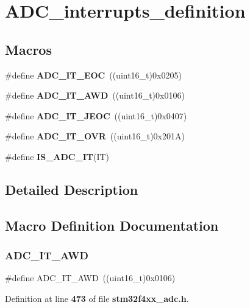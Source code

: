 \section{A\+D\+C\+\_\+interrupts\+\_\+definition}
\label{group__ADC__interrupts__definition}
\subsection*{Macros}
\begin{DoxyCompactItemize}
\item 
\#define \textbf{ A\+D\+C\+\_\+\+I\+T\+\_\+\+E\+OC}~((uint16\+\_\+t)0x0205)
\item 
\#define \textbf{ A\+D\+C\+\_\+\+I\+T\+\_\+\+A\+WD}~((uint16\+\_\+t)0x0106)
\item 
\#define \textbf{ A\+D\+C\+\_\+\+I\+T\+\_\+\+J\+E\+OC}~((uint16\+\_\+t)0x0407)
\item 
\#define \textbf{ A\+D\+C\+\_\+\+I\+T\+\_\+\+O\+VR}~((uint16\+\_\+t)0x201\+A)
\item 
\#define \textbf{ I\+S\+\_\+\+A\+D\+C\+\_\+\+IT}(IT)
\end{DoxyCompactItemize}


\subsection{Detailed Description}


\subsection{Macro Definition Documentation}
\mbox{\label{group__ADC__interrupts__definition_ga2f5c7f9900c24250a0c6ccaa7cbca946}} 
\subsubsection{A\+D\+C\+\_\+\+I\+T\+\_\+\+A\+WD}
{\footnotesize\ttfamily \#define A\+D\+C\+\_\+\+I\+T\+\_\+\+A\+WD~((uint16\+\_\+t)0x0106)}



Definition at line \textbf{ 473} of file \textbf{ stm32f4xx\+\_\+adc.\+h}.

